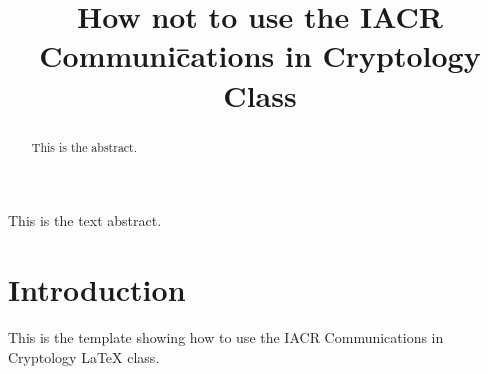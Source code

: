 \documentclass[journal=tches,version=final]{iacrj}
\title[running  = {The iacrcc class},
      ]{How not to use the IACR Communi\=cations in Cryptology Class}
\begin{document}
\maketitle

\begin{abstract}
This is the abstract.
\end{abstract}
\begin{textabstract}
This is the text abstract.
\end{textabstract}

\section{Introduction}
This is the template showing how to use the IACR Communications in Cryptology \LaTeX{} class. 
\lipsum[1-5]
\end{document}
